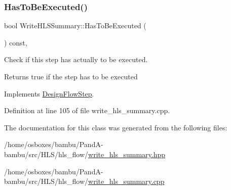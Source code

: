 \subsubsection{\texorpdfstring{Has\+To\+Be\+Executed()}{HasToBeExecuted()}}
{\footnotesize\ttfamily bool Write\+H\+L\+S\+Summary\+::\+Has\+To\+Be\+Executed (\begin{DoxyParamCaption}{ }\end{DoxyParamCaption}) const\hspace{0.3cm}{\ttfamily [override]}, {\ttfamily [virtual]}}



Check if this step has actually to be executed. 

\begin{DoxyReturn}{Returns}
true if the step has to be executed 
\end{DoxyReturn}


Implements \hyperlink{classDesignFlowStep_a1783abe0c1d162a52da1e413d5d1ef05}{Design\+Flow\+Step}.



Definition at line 105 of file write\+\_\+hls\+\_\+summary.\+cpp.



The documentation for this class was generated from the following files\+:\begin{DoxyCompactItemize}
\item 
/home/osboxes/bambu/\+Pand\+A-\/bambu/src/\+H\+L\+S/hls\+\_\+flow/\hyperlink{write__hls__summary_8hpp}{write\+\_\+hls\+\_\+summary.\+hpp}\item 
/home/osboxes/bambu/\+Pand\+A-\/bambu/src/\+H\+L\+S/hls\+\_\+flow/\hyperlink{write__hls__summary_8cpp}{write\+\_\+hls\+\_\+summary.\+cpp}\end{DoxyCompactItemize}
